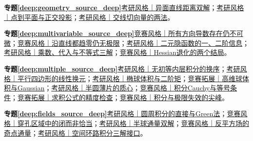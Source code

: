 \par\noindent\textbf{专题\ref{deep:geometry_source_deep}}\quad \hyperref[deep:ex:geometry_source_deep:skew]{考研风格｜异面直线距离双解}；\hyperref[deep:ex:geometry_source_deep:projection]{考研风格｜点到平面与正交投影}；\hyperref[deep:ex:geometry_source_deep:intersection]{考研风格｜交线切向量的两法}。\par
\par\noindent\textbf{专题\ref{deep:multivariable_source_deep}}\quad \hyperref[deep:ex:multivariable_source_deep:directioncounter]{竞赛风格｜所有方向导数存在仍不可微}；\hyperref[deep:ex:multivariable_source_deep:discontinuous]{竞赛风格｜沿直线都趋零仍无极限}；\hyperref[deep:ex:multivariable_source_deep:implicitmatrix]{考研风格｜二元隐函数的一、二阶信息}；\hyperref[deep:ex:multivariable_source_deep:lagrange]{考研风格｜乘数、代入与不等式三解}；\hyperref[deep:ex:multivariable_source_deep:degenerate]{竞赛风格｜Hessian退化的两个结局}。\par
\par\noindent\textbf{专题\ref{deep:multiple_source_deep}}\quad \hyperref[deep:ex:multiple_source_deep:order]{考研风格｜无初等内层积分的换序}；\hyperref[deep:ex:multiple_source_deep:linearjac]{考研风格｜平行四边形的线性换元}；\hyperref[deep:ex:multiple_source_deep:ellipsoid]{考研风格｜椭球体积与二阶矩}；\hyperref[deep:ex:multiple_source_deep:nball]{竞赛拓展｜高维球体积与Gaussian}；\hyperref[deep:ex:multiple_source_deep:centroid]{考研风格｜半圆薄片的质心}；\hyperref[deep:ex:multiple_source_deep:holder]{竞赛风格｜积分Cauchy与等号条件}；\hyperref[deep:ex:multiple_source_deep:simpson]{竞赛拓展｜求积公式的精度检查}；\hyperref[deep:ex:multiple_source_deep:badlimit]{竞赛风格｜积分与极限失效的尖峰}。\par
\par\noindent\textbf{专题\ref{deep:fields_source_deep}}\quad \hyperref[deep:ex:fields_source_deep:greenarea]{考研风格｜圆周积分的直接与Green法}；\hyperref[deep:ex:fields_source_deep:hole]{竞赛风格｜穿孔区域中的闭而非恰当}；\hyperref[deep:ex:fields_source_deep:hemisphere]{考研风格｜半球通量双解}；\hyperref[deep:ex:fields_source_deep:inverse]{竞赛风格｜反平方场的奇点通量}；\hyperref[deep:ex:fields_source_deep:stokes]{考研风格｜空间环路积分三解接口}。\par
